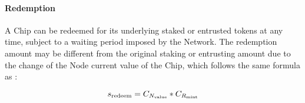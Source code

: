 \paragraph{Redemption}
A Chip can be redeemed for its underlying staked or entrusted tokens at any time, subject to a waiting period imposed by the Network.
The redemption amount may be different from the original staking or entrusting amount due to the change of the Node current value of the Chip, which follows the same formula as :

\begin{equation}
    \label{eq:chip_redeem}
    s_{\text{redeem}} = 
    C_{N_\text{value}} * C_{R_\text{mint}}
\end{equation}







